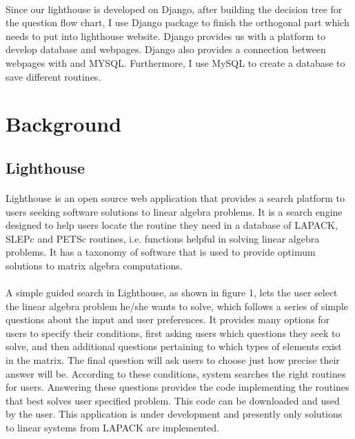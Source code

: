 \documentclass[pdftex,12pt,a4paper]{article}
\begin{document}
\paragraph{}
Since our lighthouse is developed on Django, after building the decision tree for  the question flow chart, I use Django package to finish the orthogonal part which needs to put into lighthouse website. Django provides us with a platform to develop database and webpages. Django also provides a connection between webpages with and  MYSQL. Furthermore, I use MySQL to create a database to save different routines. 


\section{Background}

\subsection{Lighthouse}
\paragraph{}
Lighthouse is an open source web application that provides a search platform to users seeking software solutions to linear algebra problems. It is a search engine designed to help users locate the routine they need in a database of LAPACK, SLEPc and PETSc routines, i.e. functions helpful in solving linear algebra problems. It has a taxonomy of software that is used to provide optimum solutions to matrix algebra computations.
\paragraph{}
A simple guided search in Lighthouse, as shown in figure 1, lets the user select the linear algebra problem he/she wants to solve, which follows a series of simple questions about the input and user preferences. It provides many options for users to specify their conditions, first asking users which questions they seek to solve, and then additional questions pertaining to which types of elements exist in the matrix. The final question will ask users to choose just how precise their answer will be. According to these conditions, system searches the right routines for users. Answering these questions provides the code implementing the routines that best solves user specified problem. This code can be downloaded and used by the user. This application is under development and presently only solutions to linear systems from LAPACK are implemented.
\end{document}
